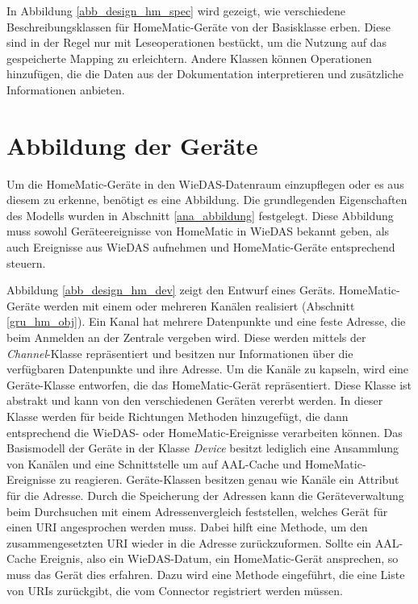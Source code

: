 \vfill
\pagebreak


In Abbildung \ref{abb_design_hm_spec} wird gezeigt, wie verschiedene Beschreibungsklassen
für HomeMatic-Geräte von der Basisklasse erben.
Diese sind in der Regel nur mit Leseoperationen bestückt, um die Nutzung auf das gespeicherte
Mapping zu erleichtern.
Andere Klassen können Operationen hinzufügen, die die Daten aus der Dokumentation \cite{homematic_xmlrpc}
interpretieren und zusätzliche Informationen anbieten.


\section{Abbildung der Geräte}
\label{des_abbildung}

Um die HomeMatic-Geräte in den WieDAS-Datenraum einzupflegen oder es aus diesem zu erkenne,
benötigt es eine Abbildung.
Die grundlegenden Eigenschaften des Modells wurden in Abschnitt \ref{ana_abbildung}
festgelegt.
Diese Abbildung muss sowohl Geräteereignisse von HomeMatic in WieDAS bekannt geben,
als auch Ereignisse aus WieDAS aufnehmen und HomeMatic-Geräte entsprechend steuern.


Abbildung \ref{abb_design_hm_dev} zeigt den Entwurf eines Geräts.
HomeMatic-Geräte werden mit einem oder mehreren Kanälen realisiert (Abschnitt \ref{gru_hm_obj}).
Ein Kanal hat mehrere Datenpunkte und eine feste Adresse, die beim Anmelden an der Zentrale
vergeben wird.
Diese werden mittels der \emph{Channel}-Klasse repräsentiert und besitzen nur
Informationen über die verfügbaren Datenpunkte und ihre Adresse.
Um die Kanäle zu kapseln, wird eine Geräte-Klasse entworfen, die das HomeMatic-Gerät
repräsentiert.
Diese Klasse ist abstrakt und kann von den verschiedenen Geräten vererbt werden.
In dieser Klasse werden für beide Richtungen Methoden hinzugefügt, die dann
entsprechend die WieDAS- oder HomeMatic-Ereignisse verarbeiten können.
Das Basismodell der Geräte in der Klasse \emph{Device} besitzt lediglich eine Ansammlung
von Kanälen und eine Schnittstelle um auf AAL-Cache und HomeMatic-Ereignisse zu reagieren.
Geräte-Klassen besitzen genau wie Kanäle ein Attribut für die Adresse.
Durch die Speicherung der Adressen kann die Geräteverwaltung beim Durchsuchen mit einem
Adressenvergleich feststellen, welches Gerät für einen URI angesprochen werden muss.
Dabei hilft eine Methode, um den zusammengesetzten URI wieder in die Adresse zurückzuformen.
Sollte ein AAL-Cache Ereignis, also ein WieDAS-Datum, ein HomeMatic-Gerät ansprechen, so muss
das Gerät dies erfahren.
Dazu wird eine Methode eingeführt, die eine Liste von URIs zurückgibt, die vom Connector
registriert werden müssen.

